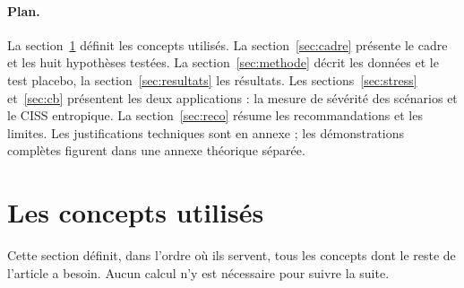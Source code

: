 \documentclass[11pt]{article}
\theoremstyle{definition}
\begin{document}
\paragraph{Plan.} La section~\ref{sec:concepts} définit les concepts utilisés.
La section~\ref{sec:cadre} présente le cadre et les huit hypothèses testées. La
section~\ref{sec:methode} décrit les données et le test placebo, la
section~\ref{sec:resultats} les résultats. Les sections~\ref{sec:stress}
et~\ref{sec:cb} présentent les deux applications : la mesure de sévérité des
scénarios et le CISS entropique. La section~\ref{sec:reco} résume les
recommandations et les limites. Les justifications techniques sont en annexe ;
les démonstrations complètes figurent dans une annexe théorique séparée.

\section{Les concepts utilisés}
\label{sec:concepts}

Cette section définit, dans l'ordre où ils servent, tous les concepts dont le
reste de l'article a besoin. Aucun calcul n'y est nécessaire pour suivre la
suite.
\end{document}
